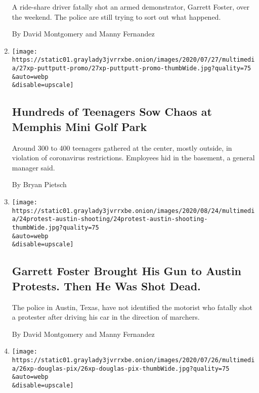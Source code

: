 \begin{enumerate}
  A ride-share driver fatally shot an armed demonstrator, Garrett
  Foster, over the weekend. The police are still trying to sort out what
  happened.

  By David Montgomery and Manny Fernandez
\item
  \href{/2020/07/27/us/teens-memphis-crowded-mini-golf.html}{}

  \texttt{[image: https://static01.graylady3jvrrxbe.onion/images/2020/07/27/multimedia/27xp-puttputt-promo/27xp-puttputt-promo-thumbWide.jpg?quality=75\\\&auto=webp\\\&disable=upscale]}

  \hypertarget{hundreds-of-teenagers-sow-chaos-at-memphis-mini-golf-park}{%
  \subsection{Hundreds of Teenagers Sow Chaos at Memphis Mini Golf
  Park}\label{hundreds-of-teenagers-sow-chaos-at-memphis-mini-golf-park}}

  Around 300 to 400 teenagers gathered at the center, mostly outside, in
  violation of coronavirus restrictions. Employees hid in the basement,
  a general manager said.

  By Bryan Pietsch
\item
  \href{/2020/07/26/us/austin-shooting-texas-protests.html}{}

  \texttt{[image: https://static01.graylady3jvrrxbe.onion/images/2020/08/24/multimedia/24protest-austin-shooting/24protest-austin-shooting-thumbWide.jpg?quality=75\\\&auto=webp\\\&disable=upscale]}

  \hypertarget{garrett-foster-brought-his-gun-to-austin-protests-then-he-was-shot-dead}{%
  \subsection{Garrett Foster Brought His Gun to Austin Protests. Then He
  Was Shot
  Dead.}\label{garrett-foster-brought-his-gun-to-austin-protests-then-he-was-shot-dead}}

  The police in Austin, Texas, have not identified the motorist who
  fatally shot a protester after driving his car in the direction of
  marchers.

  By David Montgomery and Manny Fernandez
\item
  \href{/2020/07/26/us/hurricane-douglas-hawaii.html}{}

  \texttt{[image: https://static01.graylady3jvrrxbe.onion/images/2020/07/26/multimedia/26xp-douglas-pix/26xp-douglas-pix-thumbWide.jpg?quality=75\\\&auto=webp\\\&disable=upscale]}


\end{enumerate}
